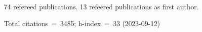 74 refereed publications. 13 refeered publications as first author.

Total citations~=~3485; h-index~=~33 (2023-09-12)